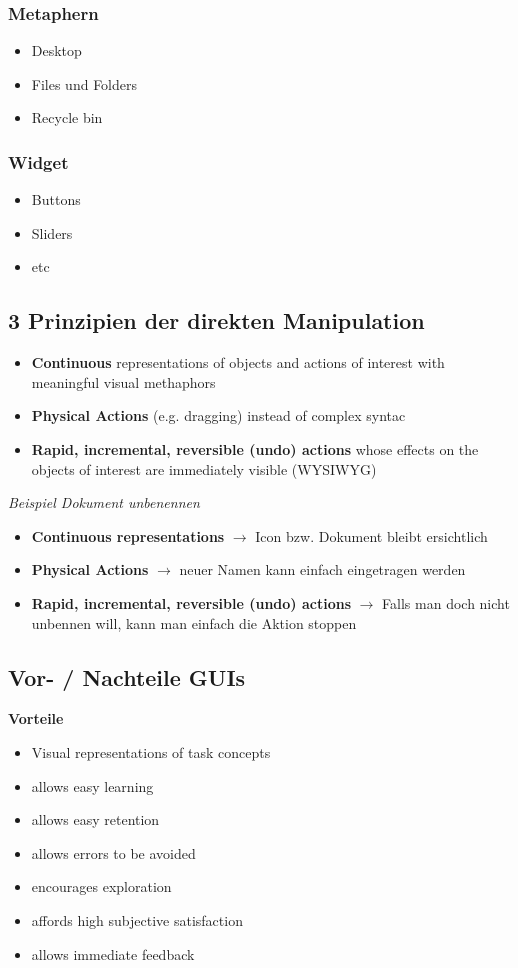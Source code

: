 \documentclass{report}
\theoremstyle{definition}
\theoremstyle{example}
\begin{document}
\subsubsection{Metaphern}
\begin{itemize}
   \item Desktop
   \item Files und Folders
   \item Recycle bin
\end{itemize}

\subsubsection{Widget}
\begin{itemize}
   \item Buttons
   \item Sliders
   \item etc
\end{itemize}

\subsection{3 Prinzipien der direkten Manipulation}
\begin{itemize}
   \item \textbf{Continuous} representations of objects and actions of interest with meaningful visual methaphors
   \item \textbf{Physical Actions} (e.g. dragging) instead of complex syntac
   \item \textbf{Rapid, incremental, reversible (undo) actions} whose effects on the objects of interest are immediately visible (WYSIWYG)
\end{itemize}

\textit{Beispiel Dokument unbenennen}
\begin{itemize}
   \item \textbf{Continuous representations} $\rightarrow$ Icon bzw. Dokument bleibt ersichtlich
   \item \textbf{Physical Actions} $\rightarrow$ neuer Namen kann einfach eingetragen werden
   \item \textbf{Rapid, incremental, reversible (undo) actions} $\rightarrow$ Falls man doch nicht unbennen will, kann man einfach die Aktion stoppen
\end{itemize}

\subsection{Vor- / Nachteile GUIs}
\textbf{Vorteile}
\begin{itemize}
   \item Visual representations of task concepts
   \item allows easy learning
   \item allows easy retention
   \item allows errors to be avoided
   \item encourages exploration
   \item affords high subjective satisfaction
   \item allows immediate feedback
\end{itemize}
\end{document}
